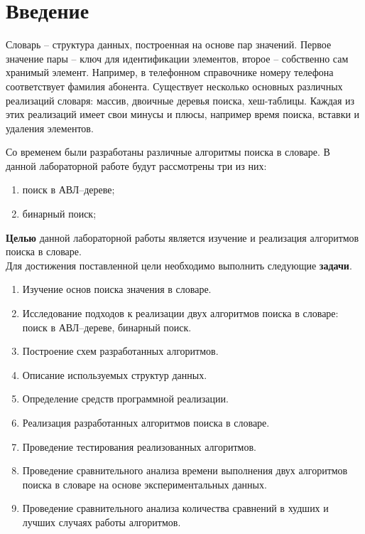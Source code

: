 \chapter*{Введение}

Словарь  -- структура данных, построенная  на  основе  пар  значений.  Первое  значение  пары -- ключ  для идентификации элементов, второе  -- собственно сам хранимый элемент. Например, в телефонном справочнике номеру  телефона  соответствует  фамилия  абонента. Существует несколько основных различных реализаций словаря: массив, двоичные деревья поиска, хеш-таблицы. Каждая из этих реализаций имеет свои минусы и плюсы, например время поиска, вставки и удаления элементов.

Со временем были разработаны различные алгоритмы поиска в словаре. В данной лабораторной работе будут рассмотрены три из них:
\begin{enumerate}
	\item поиск в АВЛ--дереве;
	\item бинарный поиск;
\end{enumerate}


\textbf{Целью} данной лабораторной работы является изучение и реализация алгоритмов поиска в словаре.\\

Для достижения поставленной цели необходимо выполнить следующие \textbf{задачи}.

\begin{enumerate}
	\item Изучение основ поиска значения в словаре.
	\item Исследование подходов к реализации двух алгоритмов поиска в словаре: поиск в АВЛ--дереве, бинарный поиск.
	\item Построение схем разработанных алгоритмов.
	\item Описание используемых структур данных.
	\item Определение средств программной реализации. 
	\item Реализация разработанных алгоритмов поиска в словаре.
	\item Проведение тестирования реализованных алгоритмов.
	\item Проведение сравнительного анализа времени выполнения двух алгоритмов поиска в словаре на основе экспериментальных данных.
	\item Проведение сравнительного анализа количества сравнений в худших и лучших случаях работы алгоритмов.
\end{enumerate}

\newpage